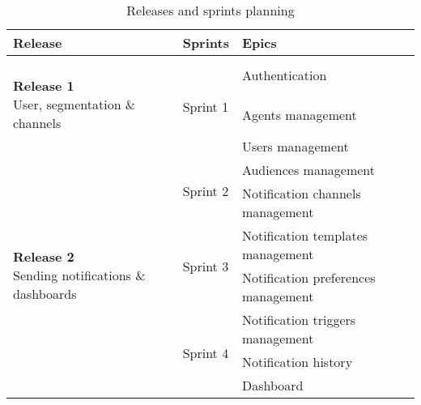 \begin{table}[hbt!]
      \caption{Releases and sprints planning}
      \label{sprint-planning}
      \begin{tabular}{ | m{} | m{} | m{} | }
            \hline
            \textbf{Release}                                                                             & \textbf{Sprints}            & \textbf{Epics}                      \\
            \hline
            \multirow{2}{9em}{\newline \textbf{Release 1} \newline  User, segmentation \& channels}
                                                                                                         & \multirow{3}{5em}{Sprint 1} & Authentication                      \\
            \cline{3-3}
                                                                                                         &                             & Agents management                   \\
            \cline{3-3}
                                                                                                         &                             & Users management                    \\
            \cline{2-3}

                                                                                                         & \multirow{2}{5em}{Sprint 2} & Audiences management                \\
            \cline{3-3}
                                                                                                         &                             & Notification channels management    \\
            \hline
            \multirow{2}{10em}{\newline \textbf{Release 2} \newline Sending notifications \& dashboards} & \multirow{2}{5em}{Sprint 3} & Notification templates management   \\
            \cline{3-3}
                                                                                                         &                             & Notification preferences management \\
            \cline{2-3}
                                                                                                         & \multirow{3}{5em}{Sprint 4} & Notification triggers management    \\
            \cline{3-3}
                                                                                                         &                             & Notification history                \\
            \cline{3-3}
                                                                                                         &                             & Dashboard                           \\
            \hline
      \end{tabular}
      \label{tab:planning}
\end{table}

